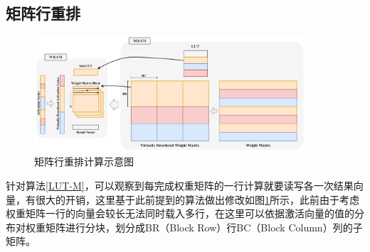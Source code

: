 \subsection{矩阵行重排}

\begin{figure}[!htbp]
	\centering
    \includegraphics[width=0.9\textwidth]{figures/LUTRow.pdf}
	\caption{矩阵行重排计算示意图}
    \label{LUTRow}
\end{figure}

针对算法\ref{LUT-M}，可以观察到每完成权重矩阵的一行计算就要读写各一次结果向量，有很大的开销，这里基于此前提到的算法做出修改如图\ref{LUTRow}所示，此前由于考虑权重矩阵一行的向量会较长无法同时载入多行，在这里可以依据激活向量的值的分布对权重矩阵进行分块，划分成BR（Block Row）行BC（Block Column）列的子矩阵。

